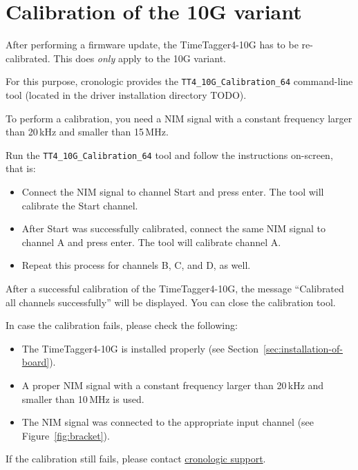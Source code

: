 \section{Calibration of the 10G variant}

After performing a firmware update, the TimeTagger4-10G has to be re-calibrated.
This does \emph{only} apply to the 10G variant.

For this purpose, cronologic provides the \texttt{TT4\_10G\_Calibration\_64} command-line tool (located in the driver installation directory TODO).

To perform a calibration, you need a NIM signal with a constant frequency larger than 20\,kHz and smaller than 15\,MHz.

Run the \texttt{TT4\_10G\_Calibration\_64} tool and follow the instructions on-screen, that is:

\begin{itemize}
    \item Connect the NIM signal to channel Start and press enter. The tool will calibrate the Start channel.
    \item After Start was successfully calibrated, connect the same NIM signal to channel A and press enter. The tool will calibrate channel A.
    \item Repeat this process for channels B, C, and D, as well.
\end{itemize}

After a successful calibration of the TimeTagger4-10G, the message ``Calibrated all channels successfully'' will be displayed.
You can close the calibration tool.

In case the calibration fails, please check the following:
\begin{itemize}
    \item The TimeTagger4-10G is installed properly (see Section~\ref{sec:installation-of-board}).
    \item A proper NIM signal with a constant frequency larger than 20\,kHz and smaller than 10\,MHz is used.
    \item The NIM signal was connected to the appropriate input channel (see Figure~\ref{fig:bracket}).
\end{itemize}

If the calibration still fails, please contact \href{https://www.cronologic.de/contact}{cronologic support}.